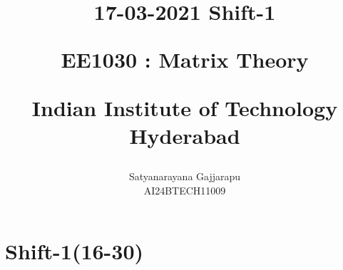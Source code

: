 \documentclass[journal]{IEEEtran}
\begin{document}

\vspace{3cm}




\title{
17-03-2021 Shift-1

\large{EE1030 : Matrix Theory}

Indian Institute of Technology Hyderabad
}
\author{Satyanarayana Gajjarapu

AI24BTECH11009
}	





\maketitle




\bigskip

\renewcommand{\thefigure}{\theenumi}
\renewcommand{\thetable}{\theenumi}


\section{\large Shift-1(16-30)}
\end{document}
